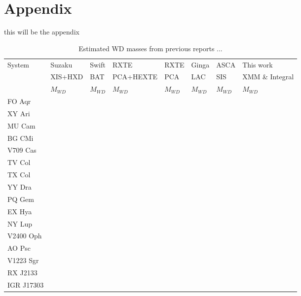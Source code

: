 \documentclass[oneside,a4paper,11pt]{report}
\begin{document}
\appendix
\section*{Appendix}
this will be the appendix



\begin{table}
\begin{center}
 

\caption{Estimated WD masses from previous reports ...}
\begin{tabular}{llllllll}
\hline
\hline
System & Suzaku & Swift & RXTE & RXTE & Ginga & ASCA& This work  \\
       & XIS+HXD & BAT& PCA+HEXTE & PCA & LAC & SIS & XMM \& Integral                     \\
       & $M_{WD}$ &$M_{WD}$ &$M_{WD} $&$M_{WD}$ &$M_{WD}$ &$M_{WD}$ &$M_{WD}$ \\
\hline
 FO Aqr      &         &        &          &     &      &         &           \\
 XY Ari      &         &        &          &     &      &         &           \\
 MU Cam      &         &        &          &     &      &         &           \\
 BG CMi&         &        &          &     &      &         &           \\
 V709 Cas&         &        &          &     &      &         &           \\
 TV Col&         &        &          &     &      &         &           \\
 TX Col&         &        &          &     &      &         &           \\
 YY Dra&         &        &          &     &      &         &           \\
 PQ Gem&         &        &          &     &      &         &           \\
 EX Hya&         &        &          &     &      &         &           \\
 NY Lup&         &        &          &     &      &         &           \\
 V2400 Oph&         &        &          &     &      &         &           \\
 AO Psc&         &        &          &     &      &         &           \\
 V1223 Sgr&         &        &          &     &      &         &           \\
 RX J2133&         &        &          &     &      &         &           \\
 IGR J17303&         &        &          &     &      &         &           \\

\hline
\end{tabular}

\end{center}
\end{table}
\end{document}
